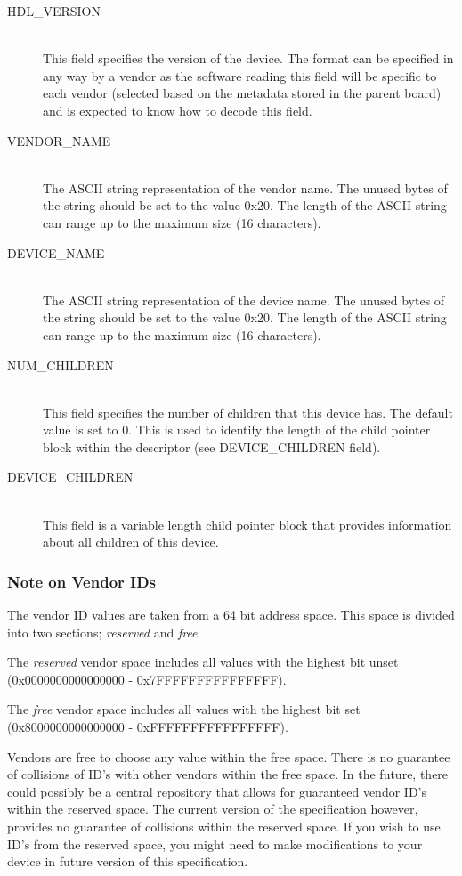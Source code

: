 \documentclass[a4paper, 12pt]{article}
\begin{document}
\begin{description}
\item[HDL\_VERSION] \hfill \\
This field specifies the version of the device. The format can be
specified in any way by a vendor as the software reading this field will be
specific to each vendor (selected based on the metadata stored in the
parent board) and is expected to know how to decode this field.

\item[VENDOR\_NAME] \hfill \\
The ASCII string representation of the vendor name. The unused bytes of the
string should be set to the value 0x20. The length of the ASCII string can range
up to the maximum size (16 characters).

\item[DEVICE\_NAME] \hfill \\
The ASCII string representation of the device name. The unused bytes of the
string should be set to the value 0x20. The length of the ASCII string can range
up to the maximum size (16 characters).

\item[NUM\_CHILDREN] \hfill \\
This field specifies the number of children that this device has. The default
value is set to 0. This is used to identify the length of the child pointer
block within the descriptor (see DEVICE\_CHILDREN field).

\item[DEVICE\_CHILDREN] \hfill \\
This field is a variable length child pointer block that provides information
about all children of this device.

\end{description}

\subsubsection{Note on Vendor IDs}
The vendor ID values are taken from a 64 bit address space.
This space is divided into two sections; \emph{reserved} and \emph{free}.

The \emph{reserved} vendor space includes all values with the highest 
bit unset (0x0000000000000000 - 0x7FFFFFFFFFFFFFFF).

The \emph{free} vendor space includes all values with the highest 
bit set (0x8000000000000000 - 0xFFFFFFFFFFFFFFFF).

Vendors are free to choose any value within the free space. There is no
guarantee of collisions of ID's with other vendors within the free space.
In the future, there could possibly be a central repository that allows
for guaranteed vendor ID's within the reserved space. The current version
of the specification however, provides no guarantee of collisions within
the reserved space. If you wish to use ID's from the reserved space, you
might need to make modifications to your device in future version of this
specification.
\end{document}
